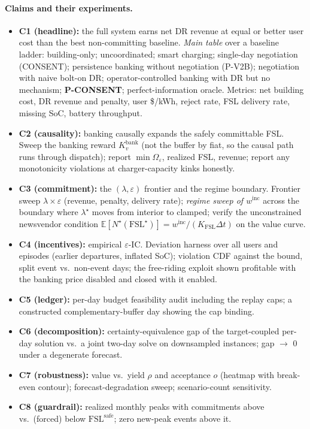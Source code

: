 \documentclass[letterpaper]{article}
\newcommand{\dt}{\Delta t}                   %
\newcommand{\Omeps}{\Omega_{\varepsilon}}
\newcommand{\FSL}{\mathrm{FSL}}
\newcommand{\winc}{w^{\mathrm{inc}}}            %
\newcommand{\Kfsl}{K_{\mathrm{FSL}}}
\newcommand{\Kbank}[1]{K^{\mathrm{bank}}_{#1}}      %
\newcommand{\Nexc}{N^{\star}}                       %
\newcommand{\Fsafe}{\FSL^{\mathrm{safe}}}           %
\begin{document}
\paragraph{Claims and their experiments.}
\begin{itemize}
\item \textbf{C1 (headline):} the full system earns net DR revenue at
equal or better user cost than the best non-committing baseline.
\emph{Main table} over a baseline ladder: building-only; uncoordinated;
smart charging; single-day negotiation (CONSENT); persistence banking
without negotiation (P-V2B); negotiation with naive bolt-on DR;
operator-controlled banking with DR but no mechanism; \textbf{P-CONSENT};
perfect-information oracle. Metrics: net building cost, DR revenue and
penalty, user \$/kWh, reject rate, FSL delivery rate, missing SoC,
battery throughput.
\item \textbf{C2 (causality):} banking causally expands the safely
committable FSL. Sweep the banking reward $\Kbank{v}$ (not the buffer by
fiat, so the causal path runs through dispatch); report
$\min\Omeps$, realized FSL, revenue; report any monotonicity violations
at charger-capacity kinks honestly.
\item \textbf{C3 (commitment):} the $(\lambda,\varepsilon)$ frontier and
the regime boundary. Frontier sweep $\lambda \times \varepsilon$
(revenue, penalty, delivery rate); \emph{regime sweep of $\winc$} across
the boundary where $\lambda^{\star}$ moves from interior to clamped;
verify the unconstrained newsvendor condition
$\mathbb{E}[\Nexc(\FSL^{\star})] = \winc/(\Kfsl\dt)$ on the value curve.
\item \textbf{C4 (incentives):} empirical $\varepsilon$-IC. Deviation
harness over all users and episodes (earlier departures, inflated SoC);
violation CDF against the bound, split event vs.\ non-event days; the
free-riding exploit shown profitable with the banking price disabled and
closed with it enabled.
\item \textbf{C5 (ledger):} per-day budget feasibility audit including
the replay caps; a constructed complementary-buffer day showing the cap
binding.
\item \textbf{C6 (decomposition):} certainty-equivalence gap of the
target-coupled per-day solution vs.\ a joint two-day solve on
downsampled instances; gap $\to$ 0 under a degenerate forecast.
\item \textbf{C7 (robustness):} value vs.\ yield $\rho$ and acceptance
$o$ (heatmap with break-even contour); forecast-degradation sweep;
scenario-count sensitivity.
\item \textbf{C8 (guardrail):} realized monthly peaks with commitments
above vs.\ (forced) below $\Fsafe$; zero new-peak events above it.
\end{itemize}
\end{document}
